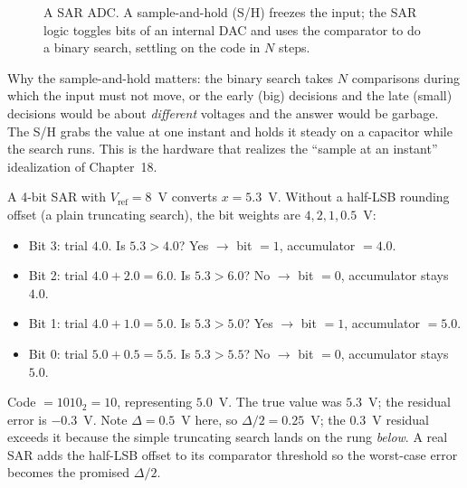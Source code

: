 \begin{figure}[H]
\centering
{}
\caption{A SAR ADC. A sample-and-hold (S/H) freezes the input; the SAR logic toggles bits of an
internal DAC and uses the comparator to do a binary search, settling on the code in $N$ steps.}
\label{ch19:fig-sar}
\end{figure}

\begin{whybox}
Why the sample-and-hold matters: the binary search takes $N$ comparisons during which the input
must not move, or the early (big) decisions and the late (small) decisions would be about
\emph{different} voltages and the answer would be garbage. The S/H grabs the value at one instant
and holds it steady on a capacitor while the search runs. This is the hardware that realizes the
``sample at an instant'' idealization of Chapter~18.
\end{whybox}

\begin{example}
\label{ch19:ex-sar}
A 4-bit SAR with $V_{\mathrm{ref}}=8$~V converts $x=5.3$~V. Without a half-LSB rounding offset (a plain truncating search), the bit weights are $4,2,1,0.5$~V:
\begin{itemize}
  \item Bit 3: trial $4.0$. Is $5.3>4.0$? Yes $\to$ bit $=1$, accumulator $=4.0$.
  \item Bit 2: trial $4.0+2.0=6.0$. Is $5.3>6.0$? No $\to$ bit $=0$, accumulator stays $4.0$.
  \item Bit 1: trial $4.0+1.0=5.0$. Is $5.3>5.0$? Yes $\to$ bit $=1$, accumulator $=5.0$.
  \item Bit 0: trial $5.0+0.5=5.5$. Is $5.3>5.5$? No $\to$ bit $=0$, accumulator stays $5.0$.
\end{itemize}
Code $=1010_2 = 10$, representing $5.0$~V. The true value was $5.3$~V; the residual error is
$-0.3$~V. Note $\Delta = 0.5$~V here, so $\Delta/2 = 0.25$~V; the $0.3$~V residual exceeds it
because the simple truncating search lands on the rung \emph{below}. A real SAR adds the half-LSB
offset to its comparator threshold so the worst-case error becomes the promised $\Delta/2$.
\end{example}

